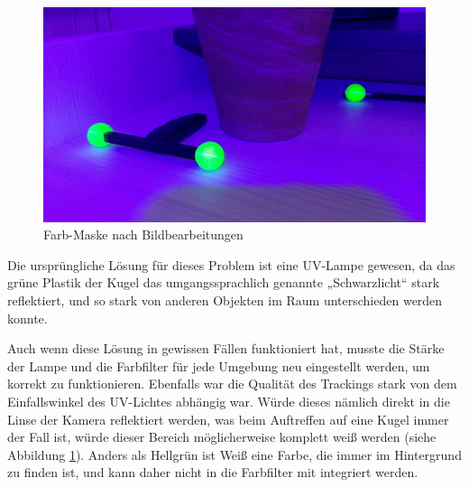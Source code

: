 \documentclass[12pt, ngerman]{article}
\begin{document}
\newpage
\begin{figure}
  \includegraphics[angle=0,width=\linewidth]{2d-uv-normal.jpg}
  \caption{Farb-Maske nach Bildbearbeitungen}
  \label{Abb: UV}
\end{figure}
Die ursprüngliche Lösung für dieses Problem ist eine UV-Lampe gewesen, da das grüne Plastik der Kugel das umgangssprachlich genannte „Schwarzlicht“ stark reflektiert, und so stark von anderen Objekten im Raum unterschieden werden konnte. 

Auch wenn diese Lösung in gewissen Fällen funktioniert hat, musste die Stärke der Lampe und die Farbfilter für jede Umgebung neu eingestellt werden, um korrekt zu funktionieren. Ebenfalls war die Qualität des Trackings stark von dem Einfallswinkel des UV-Lichtes abhängig war. Würde dieses nämlich direkt in die Linse der Kamera reflektiert werden, was beim Auftreffen auf eine Kugel immer der Fall ist, würde dieser Bereich möglicherweise komplett weiß werden (siehe Abbildung \ref{Abb: UV}). Anders als Hellgrün ist Weiß eine Farbe, die immer im Hintergrund zu finden ist, und kann daher nicht in die Farbfilter mit integriert werden. 
\end{document}
